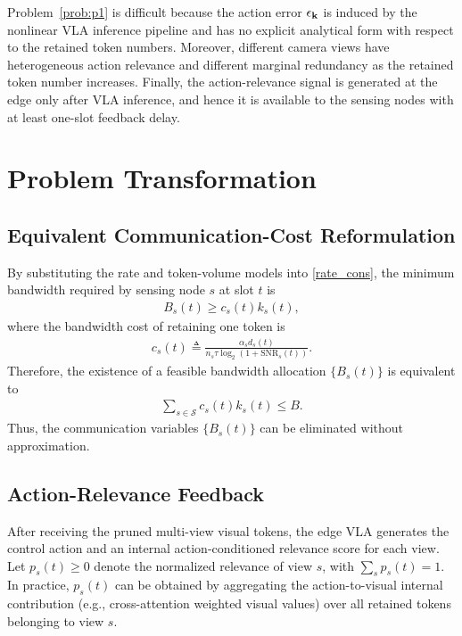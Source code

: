 \documentclass[lettersize,journal]{IEEEtran}
\theoremstyle{custom}
\begin{document}
Problem~\ref{prob:p1} is difficult because the action error $\epsilon_{\bf k}$ is induced by the nonlinear VLA inference pipeline and has no explicit analytical form with respect to the retained token numbers. Moreover, different camera views have heterogeneous action relevance and different marginal redundancy as the retained token number increases. Finally, the action-relevance signal is generated at the edge only after VLA inference, and hence it is available to the sensing nodes with at least one-slot feedback delay.

\section{Problem Transformation}
\subsection{Equivalent Communication-Cost Reformulation}
By substituting the rate and token-volume models into \eqref{rate_cons}, the minimum bandwidth required by sensing node $s$ at slot $t$ is
\begin{align}
    B_s(t) \geq c_s(t) k_s(t),
\end{align}
where the bandwidth cost of retaining one token is
\begin{align}\label{eq:token_cost}
    c_s(t) \triangleq
    \frac{\alpha_s d_s(t)}{n_s\tau\log_2\!\left(1+\mathrm{SNR}_s(t)\right)}.
\end{align}
Therefore, the existence of a feasible bandwidth allocation $\{B_s(t)\}$ is equivalent to
\begin{align}\label{eq:reduced_bandwidth}
    \sum_{s\in\mathcal S}c_s(t)k_s(t)\leq B.
\end{align}
Thus, the communication variables $\{B_s(t)\}$ can be eliminated without approximation.

\subsection{Action-Relevance Feedback}
After receiving the pruned multi-view visual tokens, the edge VLA generates the control action and an internal action-conditioned relevance score for each view. Let $p_s(t)\geq0$ denote the normalized relevance of view $s$, with $\sum_s p_s(t)=1$. In practice, $p_s(t)$ can be obtained by aggregating the action-to-visual internal contribution (e.g., cross-attention weighted visual values) over all retained tokens belonging to view $s$.
\end{document}

